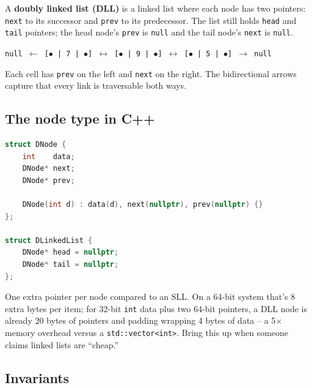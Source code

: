 \documentclass[11pt]{article}
\begin{document}
\begin{defnbox}
A \textbf{doubly linked list (DLL)} is a linked list where each
node has two pointers: \texttt{next} to its successor and
\texttt{prev} to its predecessor. The list still holds \texttt{head}
and \texttt{tail} pointers; the head node's \texttt{prev} is
\texttt{null} and the tail node's \texttt{next} is \texttt{null}.
\end{defnbox}

\begin{ideabox}
\texttt{null $\leftarrow$ [$\bullet$ | 7 | $\bullet$] $\leftrightarrow$ [$\bullet$ | 9 | $\bullet$] $\leftrightarrow$ [$\bullet$ | 5 | $\bullet$] $\to$ null}

Each cell has \texttt{prev} on the left and \texttt{next} on the
right. The bidirectional arrows capture that every link is
traversable both ways.
\end{ideabox}

\subsection{The node type in C++}

\begin{examplebox}
\begin{lstlisting}[basicstyle=\ttfamily\small,frame=single,language=C++]
struct DNode {
    int    data;
    DNode* next;
    DNode* prev;

    DNode(int d) : data(d), next(nullptr), prev(nullptr) {}
};

struct DLinkedList {
    DNode* head = nullptr;
    DNode* tail = nullptr;
};
\end{lstlisting}
One extra pointer per node compared to an SLL. On a 64-bit system
that's 8 extra bytes per item; for 32-bit \texttt{int} data plus
two 64-bit pointers, a DLL node is already 20 bytes of pointers
and padding wrapping 4 bytes of data -- a 5$\times$ memory
overhead versus a \texttt{std::vector<int>}. Bring this up when
someone claims linked lists are ``cheap.''
\end{examplebox}

\subsection{Invariants}
\end{document}
